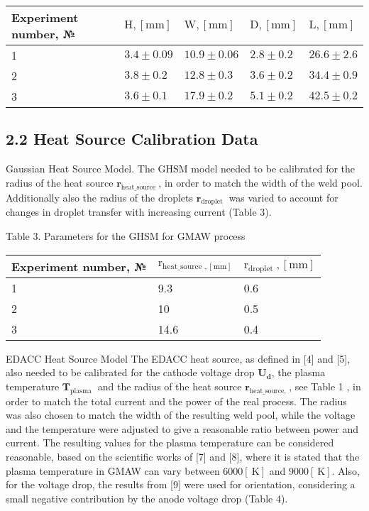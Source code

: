 \documentclass[10pt]{article}
\begin{document}
\begin{center}
\begin{tabular}{l|l|l|l|l}
\hline
Experiment number, № & $\mathrm{H},[\mathrm{mm}]$ & $\mathrm{W},[\mathrm{mm}]$ & $\mathrm{D},[\mathrm{mm}]$ & $\mathrm{L},[\mathrm{mm}]$ \\
\hline
1 & $3.4 \pm 0.09$ & $10.9 \pm 0.06$ & $2.8 \pm 0.2$ & $26.6 \pm 2.6$ \\
\hline
2 & $3.8 \pm 0.2$ & $12.8 \pm 0.3$ & $3.6 \pm 0.2$ & $34.4 \pm 0.9$ \\
\hline
3 & $3.6 \pm 0.1$ & $17.9 \pm 0.2$ & $5.1 \pm 0.2$ & $42.5 \pm 0.2$ \\
\hline
\end{tabular}
\end{center}

\subsection*{2.2 Heat Source Calibration Data}
Gaussian Heat Source Model. The GHSM model needed to be calibrated for the radius of the heat source $\mathbf{r}_{\text {heat_source }}$, in order to match the width of the weld pool. Additionally also the radius of the droplets $\mathbf{r}_{\text {droplet }}$ was varied to account for changes in droplet transfer with increasing current (Table 3).

Table 3. Parameters for the GHSM for GMAW process

\begin{center}
\begin{tabular}{l|l|l}
\hline
Experiment number, № & $\mathrm{r}_{\text {heat_source },[\mathrm{mm}]}$ & $\mathrm{r}_{\text {droplet }},[\mathrm{mm}]$ \\
\hline
1 & 9.3 & 0.6 \\
\hline
2 & 10 & 0.5 \\
\hline
3 & 14.6 & 0.4 \\
\hline
\end{tabular}
\end{center}

EDACC Heat Source Model The EDACC heat source, as defined in [4] and [5], also needed to be calibrated for the cathode voltage drop $\boldsymbol{U}_{\boldsymbol{d}}$, the plasma temperature $\boldsymbol{T}_{\text {plasma }}$ and the radius of the heat source $\mathbf{r}_{\text {heat_source, }}$, see Table 1 , in order to match the total current and the power of the real process. The radius was also chosen to match the width of the resulting weld pool, while the voltage and the temperature were adjusted to give a reasonable ratio between power and current. The resulting values for the plasma temperature can be considered reasonable, based on the scientific works of [7] and [8], where it is stated that the plasma temperature in GMAW can vary between $6000[\mathrm{~K}]$ and $9000[\mathrm{~K}]$. Also, for the voltage drop, the results from [9] were used for orientation, considering a small negative contribution by the anode voltage drop (Table 4).
\end{document}

